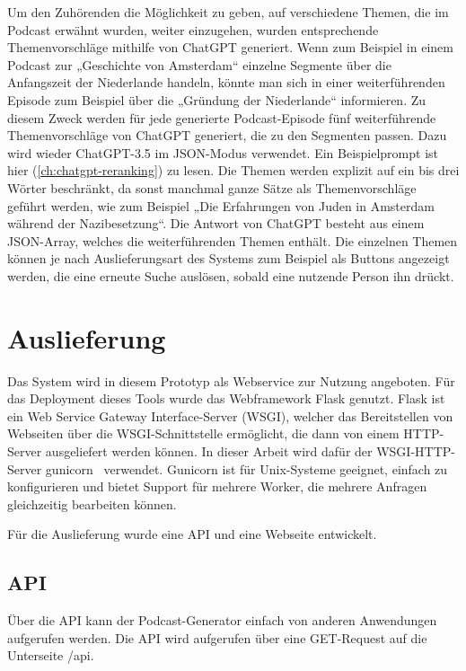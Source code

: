 Um den Zuhörenden die Möglichkeit zu geben, auf verschiedene Themen, die im Podcast erwähnt wurden, weiter einzugehen, wurden entsprechende Themenvorschläge mithilfe von ChatGPT generiert.
Wenn zum Beispiel in einem Podcast zur „Geschichte von Amsterdam“ einzelne Segmente über die Anfangszeit der Niederlande handeln, könnte man sich in einer weiterführenden Episode zum Beispiel über die „Gründung der Niederlande“ informieren.
Zu diesem Zweck werden für jede generierte Podcast-Episode fünf weiterführende Themenvorschläge von ChatGPT generiert, die zu den Segmenten passen.
Dazu wird wieder ChatGPT-3.5 im JSON-Modus verwendet.
Ein Beispielprompt ist hier (\ref{ch:chatgpt-reranking}) zu lesen.
Die Themen werden explizit auf ein bis drei Wörter beschränkt, da sonst manchmal ganze Sätze als Themenvorschläge geführt werden, wie zum Beispiel „Die Erfahrungen von Juden in Amsterdam während der Nazibesetzung“.
Die Antwort von ChatGPT besteht aus einem JSON-Array, welches die weiterführenden Themen enthält.
Die einzelnen Themen können je nach Auslieferungsart des Systems zum Beispiel als Buttons angezeigt werden, die eine erneute Suche auslösen, sobald eine nutzende Person ihn drückt.

\section{Auslieferung}

Das System wird in diesem Prototyp als Webservice zur Nutzung angeboten.
Für das Deployment dieses Tools wurde das Webframework Flask genutzt.
Flask ist ein Web Service Gateway Interface-Server (WSGI), welcher das Bereitstellen von Webseiten über die WSGI-Schnittstelle ermöglicht, die dann von einem HTTP-Server ausgeliefert werden können.
In dieser Arbeit wird dafür der WSGI-HTTP-Server gunicorn~\cite{zotero-569} verwendet.
Gunicorn ist für Unix-Systeme geeignet, einfach zu konfigurieren und bietet Support für mehrere Worker, die mehrere Anfragen gleichzeitig bearbeiten können.

Für die Auslieferung wurde eine API und eine Webseite entwickelt.

\subsection{API}

Über die API kann der Podcast-Generator einfach von anderen Anwendungen aufgerufen werden.
Die API wird aufgerufen über eine GET-Request auf die Unterseite /api.

